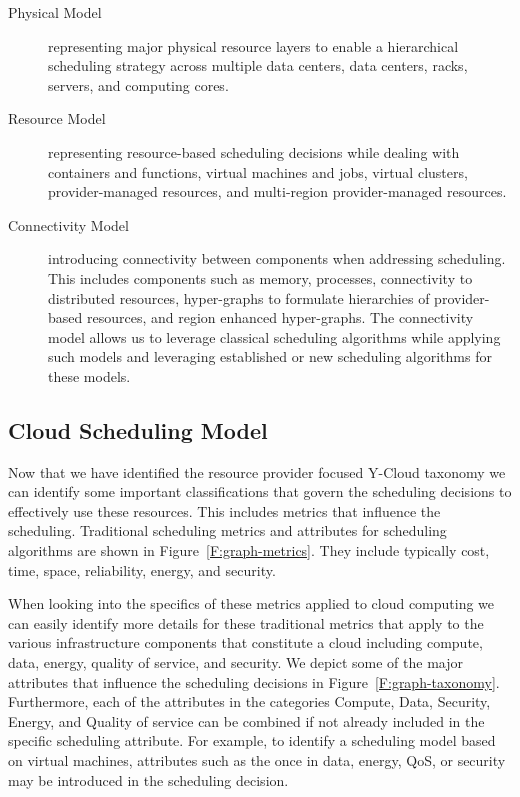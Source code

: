\documentclass[final,5p,times,twocolumn]{elsarticle}
\begin{document}
\begin{description}

\item[Physical Model] representing major physical resource layers to enable a hierarchical scheduling strategy across multiple data centers, data centers, racks, servers, and computing cores.

\item[Resource Model] representing resource-based scheduling decisions while dealing with containers and functions, virtual machines and jobs, virtual clusters, provider-managed resources, and multi-region provider-managed resources.

\item[Connectivity Model] introducing connectivity between components when addressing scheduling. This includes components such as memory, processes, connectivity to distributed resources, hyper-graphs to formulate hierarchies of provider-based resources, and region enhanced hyper-graphs. The connectivity model allows us to leverage classical scheduling algorithms while applying such models and leveraging established or new scheduling algorithms for these models.

\end{description}



\subsection{Cloud Scheduling Model}

Now that we have identified the resource provider focused Y-Cloud taxonomy we can identify some important classifications that govern the scheduling decisions to effectively use these resources. This includes metrics that influence the scheduling. Traditional scheduling metrics and attributes for scheduling algorithms are shown in Figure~\ref{F:graph-metrics}. They include typically cost, time, space, reliability, energy, and security.



When looking into the specifics of these metrics applied to cloud computing we can easily identify more details for these traditional metrics that apply to the various infrastructure components that constitute a cloud including compute, data, energy, quality of service, and security. We depict some of the major attributes that influence the scheduling decisions in Figure~\ref{F:graph-taxonomy}. Furthermore, each of the attributes in the categories Compute, Data, Security, Energy, and Quality of service can be combined if not already included in the specific scheduling attribute. For example, to identify a scheduling model based on virtual machines, attributes such as the once in data, energy, QoS, or security may be introduced in the scheduling decision.
\end{document}
